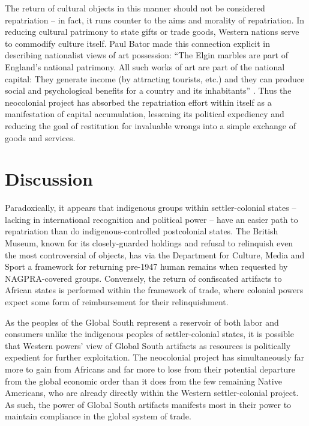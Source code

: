 \documentclass{../../../coursework}
\begin{document}
The return of cultural objects in this manner should not be considered
repatriation -- in fact, it runs counter to the aims and morality of
repatriation. In reducing cultural patrimony to state gifts or trade goods,
Western nations serve to commodify culture itself. Paul Bator made this
connection explicit in describing nationalist views of art possession: ``The
Elgin marbles are part of England's national patrimony. All such works of art
are part of the national capital: They generate income (by attracting
tourists, etc.) and they can produce social and psychological benefits for a
country and its inhabitants'' \parencite[303]{Bat82}. Thus the neocolonial
project has absorbed the repatriation effort within itself as a manifestation
of capital accumulation, lessening its political expediency and reducing the
goal of restitution for invaluable wrongs into a simple exchange of goods and
services.

\section{Discussion}

Paradoxically, it appears that indigenous groups within settler-colonial
states -- lacking in international recognition and political power -- have an
easier path to repatriation than do indigenous-controlled postcolonial states.
The British Museum, known for its closely-guarded holdings and refusal to
relinquish even the most controversial of objects, has via the Department for
Culture, Media and Sport a framework for returning pre-1947 human remains when
requested by NAGPRA-covered groups. Conversely, the return of confiscated
artifacts to African states is performed within the framework of trade, where
colonial powers expect some form of reimbursement for their relinquishment.

As the peoples of the Global South represent a reservoir of both labor and
consumers unlike the indigenous peoples of settler-colonial states, it is
possible that Western powers' view of Global South artifacts as resources is
politically expedient for further exploitation. The neocolonial project has
simultaneously far more to gain from Africans and far more to lose from their
potential departure from the global economic order than it does from the few
remaining Native Americans, who are already directly within the Western
settler-colonial project. As such, the power of Global South artifacts
manifests most in their power to maintain compliance in the global system of
trade.

\printbibliography
\end{document}
